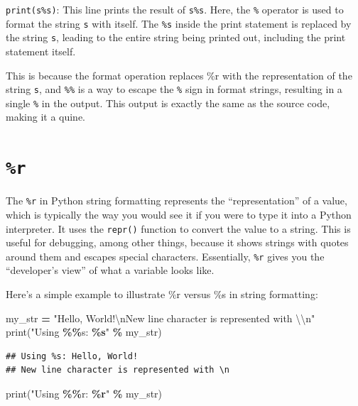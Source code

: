 \documentclass[
]{book}
\newenvironment{Shaded}{\begin{snugshade}}{\end{snugshade}}
\newcommand{\BuiltInTok}[1]{#1}
\newcommand{\CharTok}[1]{\textcolor[rgb]{0.31,0.60,0.02}{#1}}
\newcommand{\NormalTok}[1]{#1}
\newcommand{\OperatorTok}[1]{\textcolor[rgb]{0.81,0.36,0.00}{\textbf{#1}}}
\newcommand{\SpecialCharTok}[1]{\textcolor[rgb]{0.81,0.36,0.00}{\textbf{#1}}}
\newcommand{\StringTok}[1]{\textcolor[rgb]{0.31,0.60,0.02}{#1}}
\theoremstyle{definition}
\theoremstyle{definition}
\theoremstyle{definition}
\theoremstyle{definition}
\theoremstyle{remark}
\begin{document}
\texttt{print(s\%s)}: This line prints the result of \texttt{s\%s}. Here, the \texttt{\%} operator is used to format the string \texttt{s} with itself. The \texttt{\%s} inside the print statement is replaced by the string \texttt{s}, leading to the entire string being printed out, including the print statement itself.

This is because the format operation replaces \%r with the representation of the string \texttt{s}, and \texttt{\%\%} is a way to escape the \texttt{\%} sign in format strings, resulting in a single \texttt{\%} in the output. This output is exactly the same as the source code, making it a quine.

\hypertarget{r-1}{%
\section{\texorpdfstring{\texttt{\%r}}{\%r}}\label{r-1}}

The \texttt{\%r} in Python string formatting represents the ``representation'' of a value, which is typically the way you would see it if you were to type it into a Python interpreter. It uses the \texttt{repr()} function to convert the value to a string. This is useful for debugging, among other things, because it shows strings with quotes around them and escapes special characters. Essentially, \texttt{\%r} gives you the ``developer's view'' of what a variable looks like.

Here's a simple example to illustrate \%r versus \%s in string formatting:

\begin{Shaded}
\begin{Highlighting}[]
\NormalTok{my\_str }\OperatorTok{=} \StringTok{"Hello, World!}\CharTok{\textbackslash{}n}\StringTok{New line character is represented with }\CharTok{\textbackslash{}\textbackslash{}}\StringTok{n"}
\BuiltInTok{print}\NormalTok{(}\StringTok{"Using }\SpecialCharTok{\%\%}\StringTok{s: }\SpecialCharTok{\%s}\StringTok{"} \OperatorTok{\%}\NormalTok{ my\_str)}
\end{Highlighting}
\end{Shaded}

\begin{verbatim}
## Using %s: Hello, World!
## New line character is represented with \n
\end{verbatim}

\begin{Shaded}
\begin{Highlighting}[]
\BuiltInTok{print}\NormalTok{(}\StringTok{"Using }\SpecialCharTok{\%\%}\StringTok{r: }\SpecialCharTok{\%r}\StringTok{"} \OperatorTok{\%}\NormalTok{ my\_str)}
\end{Highlighting}
\end{Shaded}
\end{document}
